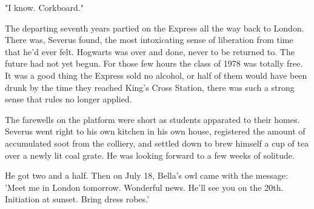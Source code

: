 \documentclass[a4paper,11pt]{article}
\begin{document}
"I know. Corkboard."

The departing seventh years partied on the Express all the way back to London. There was, Severus found, the most intoxicating sense of liberation from time that he'd ever felt. Hogwarts was over and done, never to be returned to. The future had not yet begun. For those few hours the class of 1978 was totally free. It was a good thing the Express sold no alcohol, or half of them would have been drunk by the time they reached King's Cross Station, there was such a strong sense that rules no longer applied.

The farewells on the platform were short as students apparated to their homes. Severus went right to his own kitchen in his own house, registered the amount of accumulated soot from the colliery, and settled down to brew himself a cup of tea over a newly lit coal grate. He was looking forward to a few weeks of solitude.

He got two and a half. Then on July 18, Bella's owl came with the message: 'Meet me in London tomorrow. Wonderful news. He'll see you on the 20th. Initiation at sunset. Bring dress robes.'
\end{document}
